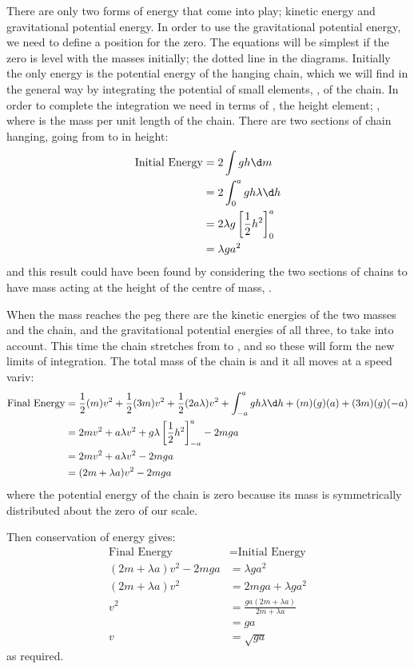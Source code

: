 \begin{problem}
{There are only two forms of energy that come into play; kinetic energy and gravitational potential energy. In order to use the gravitational potential energy, we need to define a position for the zero. The equations will be simplest if the zero is level with the masses initially; the dotted line in the diagrams. Initially the only energy is the potential energy of the hanging chain, which we will find in the general way by integrating the potential of small elements, , of the chain. In order to complete the integration we need  in terms of , the height element; , where \vari{\lambda} is the mass per unit length of the chain. There are two sections of chain hanging, going from  to  in height:
\begin{eqnarray*} 
\text{Initial Energy} &= 2 \int gh \d m \\ 
&= 2 \int_{0}^{a} gh \lambda \d h \\ 
&= 2\lambda g\left[\frac{1}{2}h^{2}\right]_{0}^{a} \\ 
&= \lambda ga^{2} 
\end{eqnarray*}
and this result could have been found by considering the two sections of chains to have mass  acting at the height of the centre of mass, .

When the mass  reaches the peg there are the kinetic energies of the two masses and the chain, and the gravitational potential energies of all three, to take into account. This time the chain stretches from  to , and so these will form the new limits of integration. The total mass of the chain is  and it all moves at a speed vari{v}:
\begin{eqnarray*} 
\text{Final Energy} &= \frac{1}{2}(m)v^{2} + \frac{1}{2}(3m)v^{2} + \frac{1}{2}(2a\lambda)v^{2} + \int_{-a}^{a}gh\lambda \d h + (m)(g)(a) + (3m)(g)(-a) \\
			&= 2mv^{2} + a\lambda v^{2} + g\lambda\left[\frac{1}{2}h^{2}\right]_{-a}^{a} - 2mga \\ &= 2mv^{2} + a\lambda v^{2} - 2mga \\ 
			&= (2m + \lambda a)v^{2} - 2mga 
\end{eqnarray*}
where the potential energy of the chain is zero because its mass is symmetrically distributed about the zero of our scale.

Then conservation of energy gives:
\begin{eqnarray*} 
\text{Final Energy} &= \text{Initial Energy} \\ 
(2m + \lambda a)v^{2} - 2mga &= \lambda ga^2 \\ 
(2m + \lambda a)v^{2} &= 2mga + \lambda ga^{2} \\
	v^{2} &= \frac{ga(2m + \lambda a)}{2m + \lambda a} \\
	 &= ga \\ 
	 v &= \sqrt{ga} 
\end{eqnarray*}
as required.
}
\end{problem}